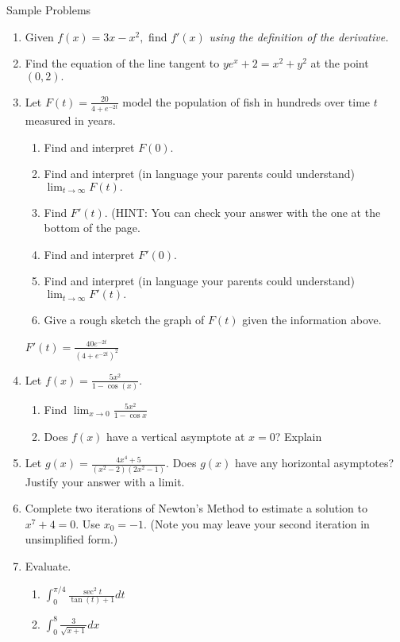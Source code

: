 \documentclass[11pt,fleqn]{article}
\newcommand{\bc}{\begin{center}}
\newcommand{\ec}{\end{center}}
\renewcommand{\d}{\displaystyle}
\begin{document}
\bc Sample Problems \ec
\begin{enumerate}
\item Given $f(x)= 3x-x^2,$ find $f'(x)$ \emph{using the definition of the derivative.}
\vspace{4in}
\item Find the equation of the line tangent to $ye^x+2=x^2+y^2$ at the point $(0,2).$
\vfill
\newpage
\item Let $F(t)=\frac{20}{4+e^{-2t}}$ model the population of fish in hundreds over time $t$ measured in years. 
\begin{enumerate}
\item Find and interpret $F(0).$
\vfill
\item Find and interpret (in language your parents could understand) $\lim_{t \to \infty} F(t).$
\vfill
\item Find $F'(t).$ (HINT: You can check your answer with the one at the bottom of the page.
\vfill
\item Find and interpret $F'(0).$
\vfill
\item Find and interpret (in language your parents could understand) $\lim_{t \to \infty} F'(t).$
\vfill
\item Give a rough sketch the graph of $F(t)$ given the information above.
\vfill
\end{enumerate}
$F'(t)=\frac{40e^{-2t}}{(4+e^{-2t})^2}$
\newpage
\item Let $f(x)=\frac{5x^2}{1-\cos(x)}.$ 
	\begin{enumerate}
	\item Find  $\d \lim_{x \to 0} \frac{5x^2}{1- \cos x}$
      \vfill
	\item Does $f(x)$ have a vertical asymptote at $x=0$? Explain
	\vfill
	\end{enumerate}
\item Let $g(x)= \frac{4x^4 + 5}{(x^2 - 2)(2x^2 -1)}.$ Does $g(x)$ have any horizontal asymptotes? Justify your answer with a limit.
\vfill


\item Complete two iterations of Newton's Method to estimate a solution to $x^7+4=0$. Use $x_0=-1.$ (Note you may leave your second iteration in unsimplified form.)
\vfill
\newpage
\item Evaluate.
	\begin{enumerate}
	\item $\d \int_0^{\pi/4} \frac{\sec^2 t}{\tan ( t) + 1} dt$
	\vfill
     	 \item $\d \int_0^8 \frac{3}{\sqrt{x+1}} dx$ 
        \vfill
        \end{enumerate}


\end{enumerate}
\end{document}
